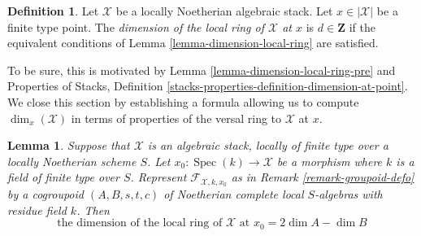 \documentclass{stacks-project}
\theoremstyle{plain}
\newtheorem{lemma}[subsection]{Lemma}
\theoremstyle{definition}
\newtheorem{definition}[subsection]{Definition}
\theoremstyle{remark}
\numberwithin{equation}{subsection}
\def\Spec{\mathop{\mathrm{Spec}}}
\begin{document}
\begin{definition}
\label{definition-dimension-local-ring}
Let $\mathcal{X}$ be a locally Noetherian algebraic stack.
Let $x \in |\mathcal{X}|$ be a finite type point.
The {\it dimension of the local ring of $\mathcal{X}$ at $x$}
is $d \in \mathbf{Z}$ if the equivalent conditions of
Lemma \ref{lemma-dimension-local-ring} are satisfied.
\end{definition}

\noindent
To be sure, this is motivated by Lemma \ref{lemma-dimension-local-ring-pre}
and Properties of Stacks, Definition
\ref{stacks-properties-definition-dimension-at-point}.
We close this section by establishing a formula allowing us to
compute $\dim_x(\mathcal{X})$ in terms of properties of the versal ring
to $\mathcal{X}$ at $x$.

\begin{lemma}
\label{lemma-dimension-formula}
Suppose that $\mathcal{X}$ is an algebraic stack, locally of finite type
over a locally Noetherian scheme $S$. Let $x_0 : \Spec(k) \to \mathcal{X}$
be a morphism where $k$ is a field of finite type over $S$. Represent
$\mathcal{F}_{\mathcal{X}, k, x_0}$ as in Remark \ref{remark-groupoid-defo}
by a cogroupoid $(A, B, s, t, c)$ of Noetherian complete local $S$-algebras
with residue field $k$. Then
$$
\text{the dimension of the local ring of }\mathcal{X}\text{ at }x_0 =
2\dim A - \dim B
$$
\end{lemma}
\end{document}
